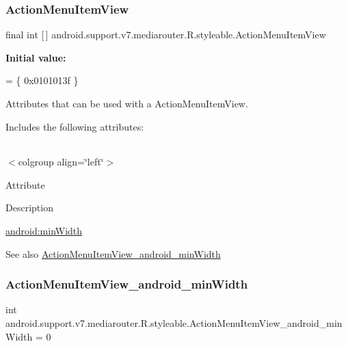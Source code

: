 \subsubsection{\texorpdfstring{Action\+Menu\+Item\+View}{ActionMenuItemView}}
{\footnotesize\ttfamily final int \mbox{[}$\,$\mbox{]} android.\+support.\+v7.\+mediarouter.\+R.\+styleable.\+Action\+Menu\+Item\+View\hspace{0.3cm}{\ttfamily [static]}}

{\bfseries Initial value\+:}
\begin{DoxyCode}
= \{
            0x0101013f
        \}
\end{DoxyCode}
Attributes that can be used with a Action\+Menu\+Item\+View. 

Includes the following attributes\+:

\tabulinesep=1mm
\begin{longtabu} spread 0pt [c]{*{0}{|X[-1]}|}
\hline
\end{longtabu}
$<$colgroup align=\char`\"{}left\char`\"{}$>$ 

Attribute

Description 

{\ttfamily \hyperlink{classandroid_1_1support_1_1v7_1_1mediarouter_1_1R_1_1styleable_ae22ee30bd6dbded962bf3c1e5d29f6b2}{android\+:min\+Width}}

\begin{DoxySeeAlso}{See also}
\hyperlink{classandroid_1_1support_1_1v7_1_1mediarouter_1_1R_1_1styleable_ae22ee30bd6dbded962bf3c1e5d29f6b2}{Action\+Menu\+Item\+View\+\_\+android\+\_\+min\+Width} 
\end{DoxySeeAlso}
\mbox{\label{classandroid_1_1support_1_1v7_1_1mediarouter_1_1R_1_1styleable_ae22ee30bd6dbded962bf3c1e5d29f6b2}} 
\subsubsection{\texorpdfstring{Action\+Menu\+Item\+View\+\_\+android\+\_\+min\+Width}{ActionMenuItemView\_android\_minWidth}}
{\footnotesize\ttfamily int android.\+support.\+v7.\+mediarouter.\+R.\+styleable.\+Action\+Menu\+Item\+View\+\_\+android\+\_\+min\+Width = 0\hspace{0.3cm}{\ttfamily [static]}}

